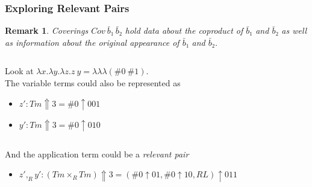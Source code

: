 \documentclass[aspectratio=169]{beamer}
\theoremstyle{remarkstyle}
\newtheorem*{remark}{Remark}
\begin{document}
\begin{frame}[fragile]
  \frametitle{Exploring Relevant Pairs}
  \begin{remark}
    Coverings $Cov \ \bar{b}₁ \ \bar{b}₂$ hold data about the coproduct of $\bar{b}₁$ and $\bar{b}₂$ as well as information about the original appearance of $\bar{b}₁$ and $\bar{b}₂$.
  \end{remark}
  \begin{example}
    \begin{columns}
      \begin{column}{0.56\textwidth}
          Look at $λx. λy. λz. z \ y = λ λ λ(\#0 \ \#1)$. \\
          The variable terms could also be represented as
          \begin{itemize}
            \item $z' : Tm ⇑ 3 = \#0 ↑ 001$
            \item $y' : Tm ⇑ 3 = \#0 ↑ 010$
          \end{itemize}
      \end{column}
      \begin{column}{0.44\textwidth}
      \end{column}
    \end{columns}
    And the application term could be a \emph{relevant pair} 
    \begin{itemize}
     \item $z' ,_R y' : (Tm ×_R Tm) ⇑ 3 = (\#0 ↑ 01, \#0 ↑ 10, RL) ↑ 011$
    \end{itemize}
  \end{example}
\end{frame}
\end{document}
